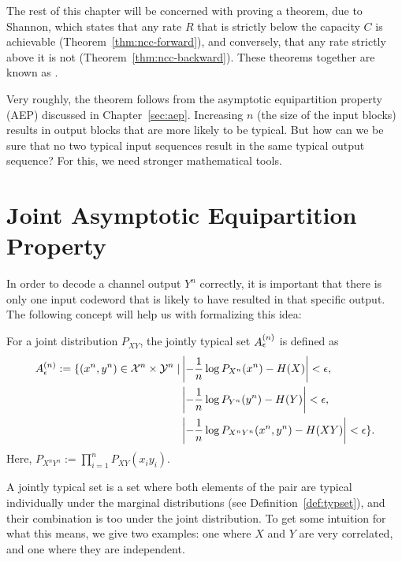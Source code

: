 The rest of this chapter will be concerned with proving a theorem, due to Shannon, which states that any rate $R$ that is strictly below the capacity $C$ is achievable (Theorem~\ref{thm:ncc-forward}), and conversely, that any rate strictly above it is not (Theorem~\ref{thm:ncc-backward}). These theorems together are known as .

Very roughly, the theorem follows from the asymptotic equipartition property (AEP) discussed in Chapter~\ref{sec:aep}. Increasing $n$ (the size of the input blocks) results in output blocks that are more likely to be typical. But how can we be sure that no two typical input sequences result in the same typical output sequence? For this, we need stronger mathematical tools.

\section{Joint Asymptotic Equipartition Property}
In order to decode a channel output $Y^n$ correctly, it is important that there is only one input codeword that is likely to have resulted in that specific output. The following concept will help us with formalizing this idea:

\begin{definition}\label{def:joint-typicality}
For a joint distribution $P_{XY}$, the jointly typical set $A_{\epsilon}^{(n)}$ is defined as
\begin{align*}
A_{\epsilon}^{(n)} := \{(x^n,y^n) \in \mathcal{X}^n \times \mathcal{Y}^n \mid &\left| - \frac{1}{n} \log P_{X^n}(x^n) - H(X)\right| < \epsilon,\\
&\left| - \frac{1}{n} \log P_{Y^n}(y^n) - H(Y)\right| < \epsilon,\\
&\left| - \frac{1}{n} \log P_{X^nY^n}(x^n,y^n) - H(XY)\right| < \epsilon\}.
\end{align*}
Here, $P_{X^nY^n} := \prod_{i=1}^nP_{XY}(x_iy_i)$.
\end{definition}
A jointly typical set is a set where both elements of the pair are typical individually under the marginal distributions (see Definition~\ref{def:typset}), and their combination is too under the joint distribution. To get some intuition for what this means, we give two examples: one where $X$ and $Y$ are very correlated, and one where they are independent.



